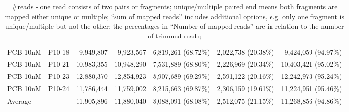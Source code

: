 \documentclass{article}
\begin{document}
\begin{table}
\begin{tabular}{ll|rr|rrr}
  PCB 10nM & P10-18  &  9,949,807 &  9,923,567        & 6,819,261 (68.72\%) & 2,022,738 (20.38\%) &  9,424,059 (94.97\%)  \\
  PCB 10nM & P10-21  & 10,983,355 & 10,948,290        & 7,531,889 (68.80\%)  & 2,226,969 (20.34\%) & 10,403,421 (95.02\%) \\
  PCB 10nM & P10-23  & 12,880,370 & 12,854,923        & 8,907,689 (69.29\%) & 2,591,122 (20.16\%) & 12,242,973 (95.24\%) \\
  PCB 10nM & P10-24  & 11,786,444 & 11,759,002        & 8,215,663 (69.87\%) & 2,306,159 (19.61\%) & 11,224,951 (95.46\%) \\
    \hline
  Average & &        11,905,896 & 11,880,040        & 8,088,091 (68.08\%) & 2,512,075 (21.15\%) & 11,268,856 (94.86\%) \\
  \end{tabular}
  \caption{\#reads - one read consists of two pairs or fragments;
    unique/multiple paired end means both fragments are mapped either
    unique or multiple; ``sum of mapped reads'' includes additional
    options, e.g. only one fragment is unique/multiple but not the
    other; the percentages in ``Number of mapped reads'' are in
    relation to the number of trimmed reads;}
    \label{tab:mapping-stats}
\end{table}
\end{document}
